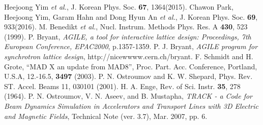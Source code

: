 \documentclass[jkps,preprint,fleqn,showpacs,showkeys,10pt,twocolumn]{revtex4}
\begin{document}
\begin{references}
 Heejoong Yim {\it et al.}, J. Korean Phys. Soc. {\bf 67}, 1364(2015).
 Chawon Park, Heejoong Yim, Garam Hahn and Dong Hyun An {\it et al.}, J. Korean Phys. Soc. {\bf 69}, 933(2016).   
 M. Benedikt {\it et al.}, Nucl. Instrum. Methods Phys. Res. A {\bf 430}, 523 (1999). 
 P. Bryant, {\it AGILE, a tool for interactive lattice design: Proceedings, 7th European Conference, EPAC2000}, p.1357-1359.
 P. J. Bryant, {\it AGILE program for synchrotron lattice design}, http://nicewwww.cern.ch/bryant.  
 F. Schmidt and H. Grote, ``MAD X an update from MAD8'', Proc. Part. Acc. Conference, Portland, U.S.A, 12.-16.5, {\bf 3497} (2003).  
 P. N. Ostroumov and K. W. Shepard, Phys. Rev. ST. Accel. Beams 11, 030101 (2001).
 H. A. Enge, Rev. of Sci. Instr. {\bf 35}, 278 (1964).  
 P. N. Ostroumov, V. N. Aseev, and B. Mustapha, {\it TRACK - a Code for Beam Dynamics Simulation in Accelerators and Transport Lines with 3D Electric and Magnetic Fields}, Technical Note (ver. 3.7), Mar. 2007, pp. 6.  
\end{references}
\end{document}
